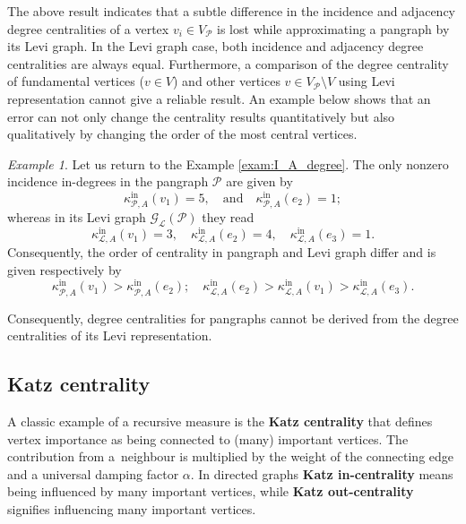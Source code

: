\documentclass[a4paper,12pt]{article}
\theoremstyle{definition}
\theoremstyle{remark}
\newtheorem{exam}{Example}
\newcommand{\mG}{\mathcal{G}}
\newcommand{\mP}{\mathcal{P}}
\newcommand{\mL}{\mathcal{L}}
\begin{document}
The above result indicates that a subtle difference in the incidence and adjacency degree centralities of a vertex $v_i\in V_{\mP}$ is lost while approximating a pangraph by its Levi graph. In the Levi graph case, both incidence and adjacency degree centralities are always equal. Furthermore, a comparison of the degree centrality of fundamental vertices ($v\in V$) and other vertices $v\in V_{\mP}\setminus V$ using Levi representation cannot give a reliable result. An example below shows that an error can not only change the centrality results quantitatively but also qualitatively by changing the order of the most central vertices. 

\begin{exam}
Let us return to the Example \ref{exam:I_A_degree}. The only nonzero incidence in-degrees in the pangraph $\mP$  are given by
\begin{equation*}
\kappa_{\mP,A}^{\mathrm{in}}(v_1)=5,\quad \textrm{and}\quad \kappa_{\mP,A}^{\mathrm{in}}(e_2)=1;
\end{equation*}
whereas in its Levi graph $\mG_{\mathcal{L}}(\mP)$ they read
\begin{equation*}
\kappa_{\mL,A}^{\mathrm{in}}(v_1)=3,\quad \kappa_{\mL,A}^{\mathrm{in}}(e_2)=4,\quad \kappa_{\mL,A}^{\mathrm{in}}(e_3)=1.
\end{equation*}
Consequently, the order of centrality in pangraph and Levi graph differ and is given respectively by
\begin{equation*}
\kappa_{\mP,A}^{\mathrm{in}}(v_1)>\kappa_{\mP,A}^{\mathrm{in}}(e_2);\quad \kappa_{\mL,A}^{\mathrm{in}}(e_2)>\kappa_{\mL,A}^{\mathrm{in}}(v_1)>\kappa_{\mL,A}^{\mathrm{in}}(e_3).
\end{equation*}

\end{exam}

Consequently, degree centralities for pangraphs cannot be derived from the degree centralities of its Levi representation.

\subsection{Katz centrality}\label{sec:Katz_centrality}
A classic example of a recursive measure is the \textbf{Katz centrality} that defines vertex importance as being connected to (many) important vertices. The contribution from a~neighbour is multiplied by the weight of the connecting edge and a universal damping factor $\alpha$. In directed graphs \textbf{Katz in-centrality} means being influenced by many important vertices, while \textbf{Katz out-centrality} signifies influencing many important vertices. 
\end{document}
